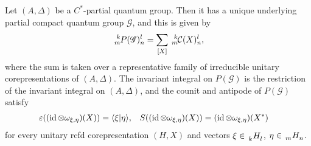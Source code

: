 \begin{Theorem} \label{thm:pcqg-inside} Let $(A,\Delta)$ be a $C^{*}$-partial quantum group. Then  it has a unique underlying partial compact quantum group $\mathscr{G}$, and this is given by
  \begin{align*}
    \Gr{P(\mathscr{G})}{k}{l}{m}{n} = \sum_{[X]}   \Gr{\mathcal{C}(X)}{k}{l}{m}{n},
  \end{align*}
where the sum is taken over a representative family of irreducible unitary corepresentations of $(A,\Delta)$.
  The invariant integral on $P(\mathscr{G})$ is the restriction of the invariant integral on $(A,\Delta)$, and the counit and antipode of $P(\mathscr{G})$ satisfy
  \begin{align} \label{eq:pcqg-counit-antipode}
    \varepsilon((\operatorname{id} \otimes \omega_{\xi,\eta})(X)) &= \langle \xi|\eta\rangle, &
    S((\operatorname{id} \otimes \omega_{\xi,\eta})(X)) &= (\operatorname{id} \otimes \omega_{\xi,\eta})(X^{*})
  \end{align}
  for every unitary rcfd corepresentation $(H,X)$ and vectors $\xi \in
  \Grd{H}{k}{l}$, $\eta \in \Grd{H}{m}{n}$. 
\end{Theorem}
